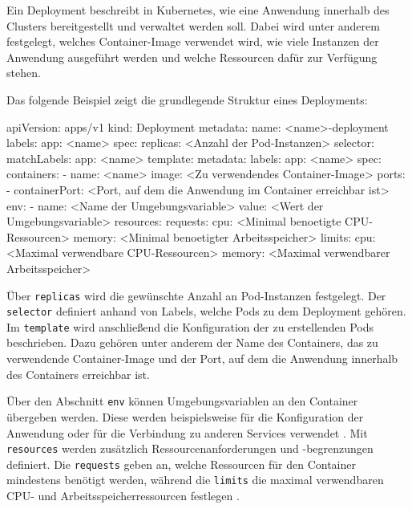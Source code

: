 Ein Deployment beschreibt in Kubernetes, wie eine Anwendung innerhalb des Clusters bereitgestellt und verwaltet werden soll. Dabei wird unter anderem festgelegt, welches Container-Image verwendet wird, wie viele Instanzen der Anwendung ausgeführt werden und welche Ressourcen dafür zur Verfügung stehen.

Das folgende Beispiel zeigt die grundlegende Struktur eines Deployments:

\begin{CodeBox}
apiVersion: apps/v1
kind: Deployment
metadata:
  name: <name>-deployment
  labels:
    app: <name>
spec:
  replicas: <Anzahl der Pod-Instanzen>
  selector:
    matchLabels:
      app: <name>
  template:
    metadata:
      labels:
        app: <name>
    spec:
      containers:
        - name: <name>
          image: <Zu verwendendes Container-Image>
          ports:
            - containerPort: <Port, auf dem die Anwendung im Container erreichbar ist>
          env:
            - name: <Name der Umgebungsvariable>
              value: <Wert der Umgebungsvariable>
          resources:
            requests:
              cpu: <Minimal benoetigte CPU-Ressourcen>
              memory: <Minimal benoetigter Arbeitsspeicher>
            limits:
              cpu: <Maximal verwendbare CPU-Ressourcen>
              memory: <Maximal verwendbarer Arbeitsspeicher>
\end{CodeBox}

Über \texttt{replicas} wird die gewünschte Anzahl an Pod-Instanzen festgelegt. Der \texttt{selector} definiert anhand von Labels, welche Pods zu dem Deployment gehören. Im \texttt{template} wird anschließend die Konfiguration der zu erstellenden Pods beschrieben. Dazu gehören unter anderem der Name des Containers, das zu verwendende Container-Image und der Port, auf dem die Anwendung innerhalb des Containers erreichbar ist.

Über den Abschnitt \texttt{env} können Umgebungsvariablen an den Container übergeben werden. Diese werden beispielsweise für die Konfiguration der Anwendung oder für die Verbindung zu anderen Services verwendet \cite{kubernetes_deployment_deployment}. Mit \texttt{resources} werden zusätzlich Ressourcenanforderungen und -begrenzungen definiert. Die \texttt{requests} geben an, welche Ressourcen für den Container mindestens benötigt werden, während die \texttt{limits} die maximal verwendbaren CPU- und Arbeitsspeicherressourcen festlegen \cite{kubernetes_deployment_ressource}.

\newpage

